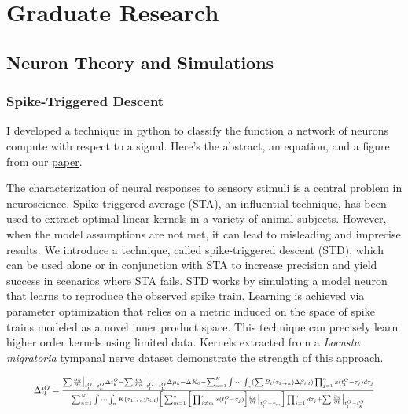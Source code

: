 \documentclass[../resume.tex]{subfiles}
\begin{document}
\section{Graduate Research}

\subsection{Neuron Theory and Simulations}

\subsubsection{Spike-Triggered Descent}
I developed a technique in python to classify the function a network of neurons compute with respect to a signal.  Here's the abstract, an equation, and a figure from our \href{https://arxiv.org/pdf/2005.05572.pdf}{paper}.

The characterization of neural responses to sensory stimuli is a central problem
in neuroscience. Spike-triggered average (STA), an influential technique, has been
used to extract optimal linear kernels in a variety of animal subjects. However,
when the model assumptions are not met, it can lead to misleading and imprecise
results. We introduce a technique, called spike-triggered descent (STD), which can
be used alone or in conjunction with STA to increase precision and yield success
in scenarios where STA fails. STD works by simulating a model neuron that learns
to reproduce the observed spike train. Learning is achieved via parameter optimization that relies on a metric induced on the space of spike trains modeled as a
novel inner product space. This technique can precisely learn higher order kernels
using limited data. Kernels extracted from a \textit{Locusta migratoria} tympanal nerve
dataset demonstrate the strength of this approach.

\begin{equation} \label{eq:GCSRMdt}
\resizebox{.9\hsize}{!}{$
\Delta t_l^O = 
\frac{
\sum \frac{\partial \eta}{\partial t} \big|_{t_l^O - t_k^O}  \Delta t_k^O
-
\sum \frac{\partial \eta}{\partial \mu} \big|_{t_l^O - t_k^O} \Delta \mu_k
-
\Delta K_0
- 
\sum_{n=1}^N  \idotsint_n
(\sum B_i(\tau_{1 \rightarrow n}) \Delta \beta_{i,l})
\prod_{j = 1}^n
x(t_l^O - \tau_j)
d\tau_j
}
{
\sum_{n=1}^N  \idotsint_n
K(\tau_{1 \rightarrow n}; \beta_{i,l})
\Big[
\sum_{m=1}^n
\Big[ 
\prod_{j \ne m}^n
x(t_l^O - \tau_j)
\Big]
\frac{\partial x}{\partial t} \big|_{t_l^O - \tau_m} 
\Big]
\prod_{j = 1}^n
d\tau_j
+ \sum \frac{\partial \eta}{\partial t} \big|_{t_l^O - t_k^O}
}
$}
\end{equation}
\end{document}
